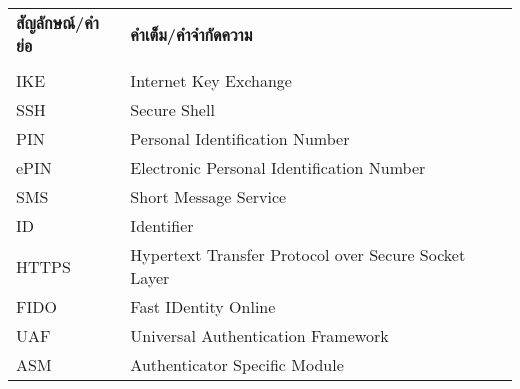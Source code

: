 \begin{tabular}{ll}
    \textbf{สัญลักษณ์/คำย่อ} & \textbf{คำเต็ม/คำจำกัดความ}                            \\\\
    IKE                  & Internet Key Exchange                                \\[1.5ex]
    SSH                  & Secure Shell                                         \\[1.5ex]
    PIN                  & Personal Identification Number                       \\[1.5ex]
    ePIN                 & Electronic Personal Identification Number            \\[1.5ex]
    SMS                  & Short Message Service                                \\[1.5ex]
    ID                   & Identifier                                           \\[1.5ex]
    HTTPS                & Hypertext Transfer Protocol over Secure Socket Layer \\[1.5ex]
    FIDO                 & Fast IDentity Online                                 \\[1.5ex]
    UAF                  & Universal Authentication Framework                   \\[1.5ex]
    ASM                  & Authenticator Specific Module
\end{tabular}
